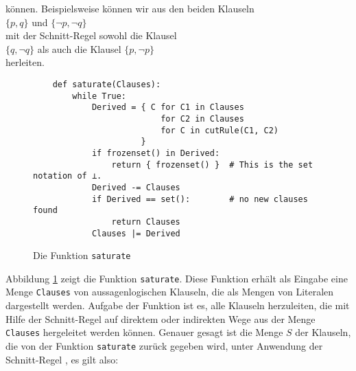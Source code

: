 \begin{enumerate}
      können.  Beispielsweise können wir aus den beiden Klauseln
      \\[0.2cm]
      \hspace*{1.3cm}
      $\{ p, q \}$ \quad und \quad $\{ \neg p, \neg q \}$ 
      \\[0.2cm]
      mit der Schnitt-Regel sowohl die Klausel
      \\[0.2cm]
      \hspace*{1.3cm}
      $\{q, \neg q\}$ \quad als auch die Klausel \quad $\{p, \neg p \}$
      \\[0.2cm]
      herleiten.
\end{enumerate}

\begin{figure}[!ht]
\centering
\begin{verbatim}
    def saturate(Clauses):
        while True:
            Derived = { C for C1 in Clauses
                          for C2 in Clauses
                          for C in cutRule(C1, C2)
                      }
            if frozenset() in Derived:
                return { frozenset() }  # This is the set notation of ⊥.
            Derived -= Clauses
            if Derived == set():        # no new clauses found
                return Clauses
            Clauses |= Derived
\end{verbatim}
\vspace*{-0.3cm}
\caption{Die Funktion \texttt{saturate}}
\label{fig:Completeness.ipynb-2}
\end{figure}
    
Abbildung \ref{fig:Completeness.ipynb-2} zeigt die Funktion \texttt{saturate}.  Diese Funktion erhält
als Eingabe eine Menge \texttt{Clauses} von aus\-sagenlogischen Klauseln, die als Mengen von Literalen
dargestellt werden.  Aufgabe der Funktion ist es, alle Klauseln herzuleiten, die mit Hilfe der
Schnitt-Regel auf direktem oder indirekten Wege aus der Menge \texttt{Clauses} hergeleitet werden
können.  Genauer gesagt ist die Menge $S$ der Klauseln, die von der Funktion \texttt{saturate}
zurück gegeben wird, unter Anwendung der Schnitt-Regel , es gilt also:


